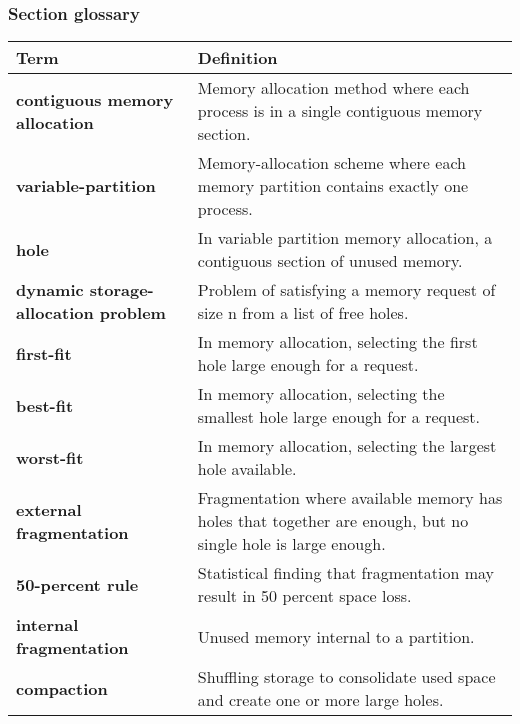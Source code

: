 \subsubsection*{Section glossary}
\begin{tabular}{p{}p{}}
    \toprule
    \textbf{Term} & \textbf{Definition} \\
    \midrule
    \textbf{contiguous memory allocation} & Memory allocation method where each process is in a single contiguous memory section. \\
    \textbf{variable-partition} & Memory-allocation scheme where each memory partition contains exactly one process. \\
    \textbf{hole} & In variable partition memory allocation, a contiguous section of unused memory. \\
    \textbf{dynamic storage-allocation problem} & Problem of satisfying a memory request of size n from a list of free holes. \\
    \textbf{first-fit} & In memory allocation, selecting the first hole large enough for a request. \\
    \textbf{best-fit} & In memory allocation, selecting the smallest hole large enough for a request. \\
    \textbf{worst-fit} & In memory allocation, selecting the largest hole available. \\
    \textbf{external fragmentation} & Fragmentation where available memory has holes that together are enough, but no single hole is large enough. \\
    \textbf{50-percent rule} & Statistical finding that fragmentation may result in 50 percent space loss. \\
    \textbf{internal fragmentation} & Unused memory internal to a partition. \\
    \textbf{compaction} & Shuffling storage to consolidate used space and create one or more large holes. \\
    \bottomrule
\end{tabular}
